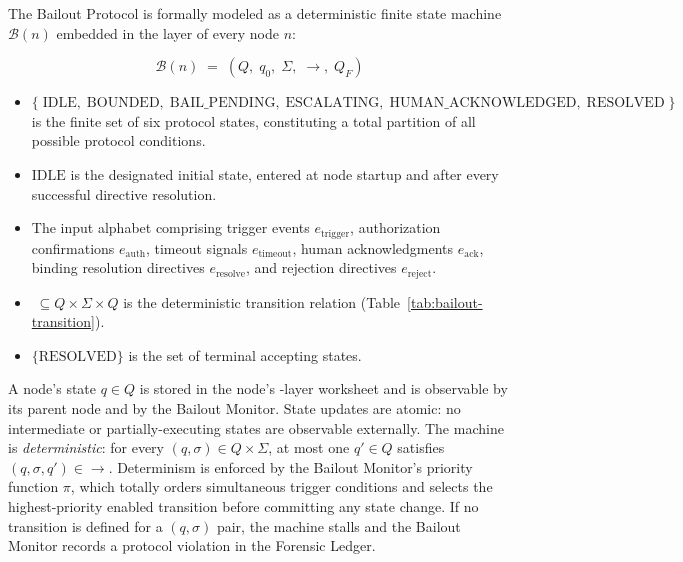 The Bailout Protocol is formally modeled as a deterministic finite state machine $\mathcal{B}(n)$ embedded in the \fact{} layer of every \bxthree{} node $n$:

\[
\mathcal{B}(n) \;=\; (Q,\; q_0,\; \Sigma,\; \rightarrow,\; Q_F)
\]

\begin{itemize}\itemsep=0pt
\item[$Q$] $\{\; \text{IDLE},\; \text{BOUNDED},\; \text{BAIL\_PENDING},\; \text{ESCALATING},\; \text{HUMAN\_ACKNOWLEDGED},\; \text{RESOLVED}\; \}$ is the finite set of six protocol states, constituting a total partition of all possible protocol conditions.
\item[$q_0$] $\text{IDLE}$ is the designated initial state, entered at node startup and after every successful directive resolution.
\item[$\Sigma$] The input alphabet comprising trigger events $e_{\text{trigger}}$, authorization confirmations $e_{\text{auth}}$, timeout signals $e_{\text{timeout}}$, human acknowledgments $e_{\text{ack}}$, binding resolution directives $e_{\text{resolve}}$, and rejection directives $e_{\text{reject}}$.
\item[$\rightarrow$] $\; \subseteq Q \times \Sigma \times Q$ is the deterministic transition relation (Table~\ref{tab:bailout-transition}).
\item[$Q_F$] $\{\text{RESOLVED}\}$ is the set of terminal accepting states.
\end{itemize}

A node's state $q \in Q$ is stored in the node's \fact-layer worksheet and is observable by its parent node and by the Bailout Monitor. State updates are atomic: no intermediate or partially-executing states are observable externally. The machine is \emph{deterministic}: for every $(q, \sigma) \in Q \times \Sigma$, at most one $q' \in Q$ satisfies $(q, \sigma, q') \in \rightarrow$. Determinism is enforced by the Bailout Monitor's priority function $\pi$, which totally orders simultaneous trigger conditions and selects the highest-priority enabled transition before committing any state change. If no transition is defined for a $(q, \sigma)$ pair, the machine stalls and the Bailout Monitor records a protocol violation in the Forensic Ledger.

